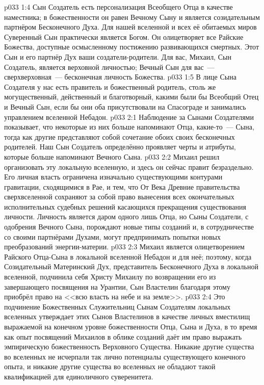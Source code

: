 \vs p033 1:4 Сын Создатель есть персонализация Всеобщего Отца в качестве наместника; в божественности он равен Вечному Сыну и является созидательным партнёром Бесконечного Духа. Для нашей вселенной и всех её обитаемых миров Суверенный Сын практически является Богом. Он олицетворяет все Райские Божества, доступные осмысленному постижению развивающихся смертных. Этот Сын и его партнёр Дух  ваши создатели\hyp{}родители. Для вас, Михаил, Сын Создатель, является верховной личностью; Вечный Сын для вас~--- сверхверховная~--- бесконечная личность Божества.
\vs p033 1:5 \pc В лице Сына Создателя у нас есть правитель и божественный родитель, столь же могущественный, действенный и благотворный, какими были бы Всеобщий Отец и Вечный Сын, если бы они оба присутствовали на Спасограде и занимались управлением вселенной Небадон.
\vs p033 2:1 Наблюдение за Сынами Создателями показывает, что некоторые из них больше напоминают Отца, какие\hyp{}то~--- Сына, тогда как другие представляют собой сочетание обоих своих бесконечных родителей. Наш Сын Создатель определённо проявляет черты и атрибуты, которые больше напоминают Вечного Сына.
\vs p033 2:2 Михаил решил организовать эту локальную вселенную, и здесь он сейчас правит безраздельно. Его личная власть ограничена изначально существующими контурами гравитации, сходящимися в Рае, и тем, что От Века Древние правительства сверхвселенной сохраняют за собой право вынесения всех окончательных исполнительных судебных решений касающихся прекращения существования личности. Личность является даром одного лишь Отца, но Сыны Создатели, с одобрения Вечного Сына, порождают новые типы созданий и, в сотрудничестве со своими партнёрами Духами, могут предпринимать попытки новых преобразований энергии\hyp{}материи.
\vs p033 2:3 \pc Михаил является олицетворением Райского Отца\hyp{}Сына в локальной вселенной Небадон и для неё; поэтому, когда Созидательный Материнский Дух, представитель Бесконечного Духа в локальной вселенной, подчинила себя Христу Михаилу по возвращении его из завершающего посвящения на Урантии, Сын Властелин благодаря этому приобрёл право на <<всю власть на небе и на земле>>.
\vs p033 2:4 Это подчинение Божественных Служительниц Сынам Создателям локальных вселенных утверждает этих Сынов Властелинов в качестве личных вместилищ выражаемой на конечном уровне божественности Отца, Сына и Духа, в то время как опыт посвящений Михаилов в облике созданий даёт им право выражать эмпирическую божественность Верховного Существа. Никакие другие существа во вселенных не исчерпали так лично потенциалы существующего конечного опыта, и никакие другие существа во вселенных не обладают такой квалификацией для единоличного суверенитета.
